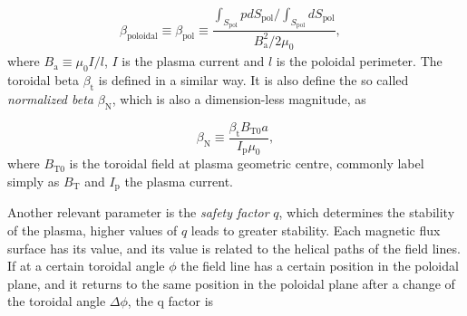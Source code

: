 \documentclass[a4paper,12pt,oneside]{book}
\begin{document}
\begin{equation}
\begin{array}{cc}

\beta_{\text{poloidal}} \equiv \beta_{\text{pol}} \equiv \dfrac{\int_{S_\text{pol}} p dS_\text{pol} / \int_{S_\text{pol}} dS_\text{pol}}{B_\text{a}^2/2 \mu_0}, &
\end{array}
\end{equation}
%
where $B_\text{a} \equiv \mu_0 I/l$, $I$ is the plasma current and $l$ is the poloidal perimeter. The toroidal beta $\beta_\text{t}$ is defined in a similar way. It is also define the so called \textit{normalized beta} $\beta_\text{N}$, which is also a dimension-less magnitude, as

\begin{equation}
\beta_\text{N} \equiv \dfrac{\beta_\text{t} B_{\text{T}0} a}{I_\text{p} \mu_0},
\end{equation}
%
where $B_{\text{T}0}$ is the toroidal field at plasma geometric centre, commonly label simply as $B_\text{T}$ and $I_\text{p}$ the plasma current.

Another relevant parameter is the \textit{safety factor} $q$, which determines the stability of the plasma, higher values of $q$ leads to greater stability. Each magnetic flux surface has its value, and its value is related to the helical paths of the field lines. If at a certain toroidal angle $\phi$ the field line has a certain position in the poloidal plane, and it returns to the same position in the poloidal plane after a change of the toroidal angle $\Delta \phi$, the q factor is
\end{document}
